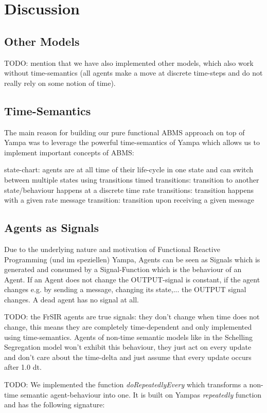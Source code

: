 \section{Discussion}

\subsection{Other Models}
TODO: mention that we have also implemented other models, which also work without time-semantics (all agents make a move at discrete time-steps and do not really rely on some notion of time). 

\subsection{Time-Semantics}
The main reason for building our pure functional ABMS approach on top of Yampa was to leverage the powerful time-semantics of Yampa which allows us to implement important concepts of ABMS:

state-chart: agents are at all time of their life-cycle in one state and can switch between multiple states using transitions 
timed transitions: transition to another state/behaviour happens at a discrete time
rate transitions: transition happens with a given rate
message transition: transition upon receiving a given message 

\subsection{Agents as Signals}
Due to the underlying nature and motivation of Functional Reactive Programming (und im speziellen) Yampa, Agents can be seen as Signals which is generated and consumed by a Signal-Function which is the behaviour of an Agent. If an Agent does not change the OUTPUT-signal is constant, if the agent changes e.g. by sending a message, changing its state,... the OUTPUT signal changes. A dead agent has no signal at all.

TODO: the FrSIR agents are true signals: they don't change when time does not change, this means they are completely time-dependent and only implemented using time-semantics. Agents of non-time semantic models like in the Schelling Segregation model won't exhibit this behaviour, they just act on every update and don't care about the time-delta and just assume that every update occurs after 1.0 dt.

TODO: We implemented the function \textit{doRepeatedlyEvery} which transforms a non-time semantic agent-behaviour into one. It is built on Yampas \textit{repeatedly} function and has the following signature:



